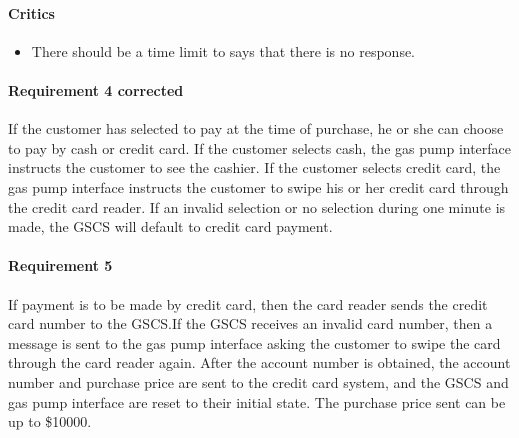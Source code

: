 \begin{framed}
    \paragraph{Critics}
    \begin{itemize}
        \item There should be a time limit to says that there is no
            response.
    \end{itemize}

    \paragraph{Requirement 4 corrected} If the customer has selected to pay at the time of
    purchase, he or she can choose to pay by cash or credit card. If the
    customer selects cash, the gas pump interface instructs the customer to see
    the cashier. If the customer selects credit card, the gas pump interface
    instructs the customer to swipe his or her credit card through the credit
    card reader. If an invalid selection or no selection during one
    minute is made, the GSCS will default to credit card payment.
\end{framed}

\paragraph{Requirement 5} If payment is to be made by credit card, then the
card reader sends the credit card number to the GSCS.\@ If the GSCS receives
an invalid card number, then a message is sent to the gas pump interface
asking the customer to swipe the card through the card reader again. After
the account number is obtained, the account number and purchase price are
sent to the credit card system, and the GSCS and gas pump interface are
reset to their initial state. The purchase price sent can be up
to \${}10000.


